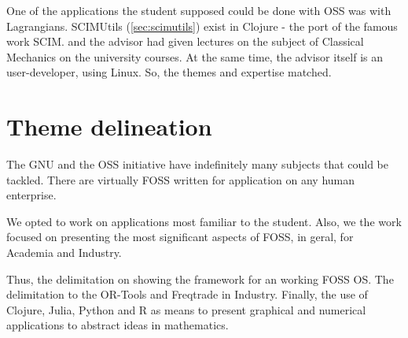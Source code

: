 \documentclass[
12pt,				%
openright,			%
oneside,			%
a4paper,			%
brazil,				%
english,			  %
]{abntex2}
\begin{document}
One of the applications the student supposed could be done with OSS
was with Lagrangians. SCIMUtils (\autoref{sec:scimutils}) exist in
Clojure - the port of the famous work SCIM. and the advisor had given
lectures on the subject of Classical Mechanics on the university
courses. At the same time, the advisor itself is an user-developer,
using Linux. So, the themes and expertise matched.


\section{Theme delineation}
The GNU and the OSS initiative have indefinitely many subjects that
could be tackled. There are virtually FOSS written for application on
any human enterprise.   

We opted to work on applications most familiar to the student. Also,
we the work focused on presenting the most significant aspects of
FOSS, in geral, for Academia and Industry.

Thus, the delimitation on showing the framework for an working FOSS
OS. The delimitation to the OR-Tools and Freqtrade in
Industry. Finally, the use of Clojure, Julia, Python and R as means to
present graphical and numerical applications to abstract ideas in mathematics.
\end{document}
